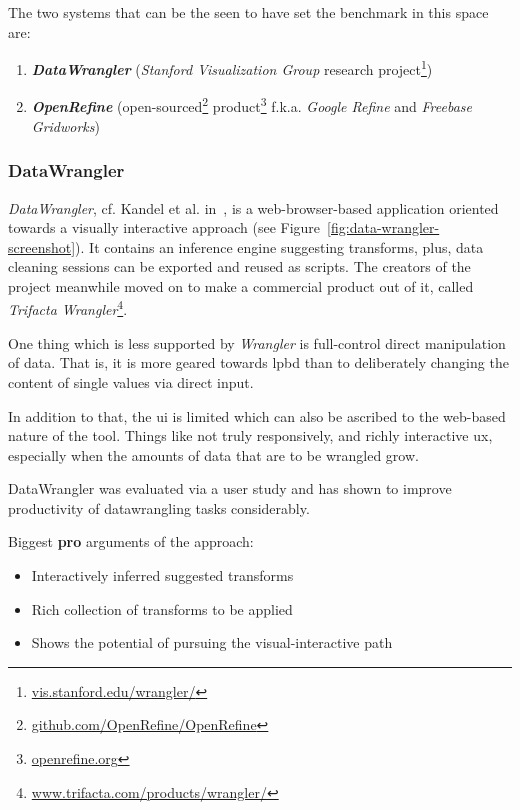 The two systems that can be the seen to have set the benchmark in this space are:

\begin{enumerate}
  \item \textbf{\emph{DataWrangler}} (\emph{Stanford Visualization Group} research project\footnote{\textcolor{blue}{\href{http://vis.stanford.edu/wrangler/}{vis.stanford.edu/wrangler/}}})~\cite{Kandel2011a}
  \item \textbf{\emph{OpenRefine}} (open-sourced\footnote{\textcolor{blue}{\href{https://github.com/OpenRefine/OpenRefine}{github.com/OpenRefine/OpenRefine}}} product\footnote{\textcolor{blue}{\href{http://openrefine.org/}{openrefine.org}}} f.k.a. \emph{Google Refine} and \emph{Freebase Gridworks})
\end{enumerate}


\subsubsection{DataWrangler}

\emph{DataWrangler}, cf. Kandel et al. in~\cite{Kandel2011a}, is a web-browser-based application oriented towards a visually interactive approach (see Figure~\ref{fig:data-wrangler-screenshot}).
It contains an inference engine suggesting transforms, plus, data cleaning sessions can be exported and reused as scripts.
The creators of the project meanwhile moved on to make a commercial product out of it, called \emph{Trifacta Wrangler}\footnote{\textcolor{blue}{\href{https://www.trifacta.com/products/wrangler/}{www.trifacta.com/products/wrangler/}}}.

One thing which is less supported by \emph{Wrangler} is full-control direct manipulation of data.
That is, it is more geared towards \gls{lpbd} than to deliberately changing the content of single values via direct input.

In addition to that, the \gls{ui} is limited which can also be ascribed to the web-based nature of the tool.
Things like not truly responsively, and richly interactive \gls{ux}, especially when the amounts of data that are to be wrangled grow.

DataWrangler was evaluated via a user study and has shown to improve productivity of \gls{datawrangling} tasks considerably.

Biggest \textbf{pro} arguments of the approach:

\begin{itemize}
  \item Interactively inferred suggested transforms
  \item Rich collection of transforms to be applied
  \item Shows the potential of pursuing the visual-interactive path
\end{itemize}


